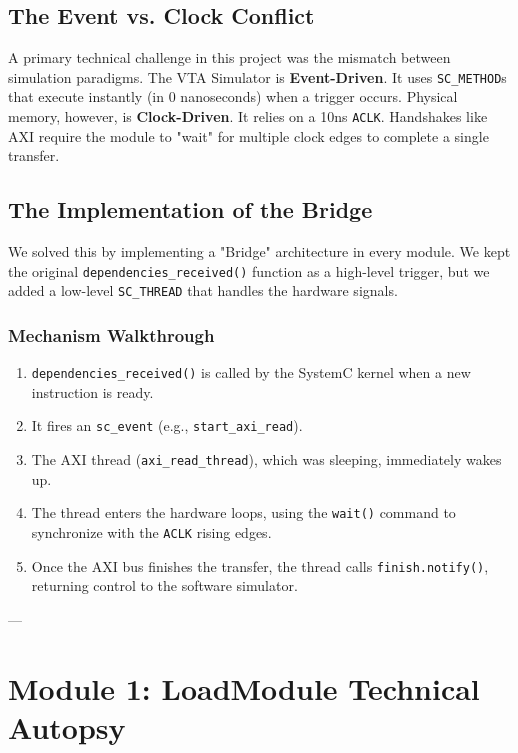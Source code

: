 \documentclass[11pt,a4paper]{report}
\begin{document}
\section{The Event vs. Clock Conflict}
A primary technical challenge in this project was the mismatch between simulation paradigms. 
The VTA Simulator is \textbf{Event-Driven}. It uses \texttt{SC\_METHOD}s that execute instantly (in 0 nanoseconds) when a trigger occurs. 
Physical memory, however, is \textbf{Clock-Driven}. It relies on a 10ns \texttt{ACLK}. Handshakes like AXI require the module to "wait" for multiple clock edges to complete a single transfer.

\section{The Implementation of the Bridge}
We solved this by implementing a "Bridge" architecture in every module. We kept the original \texttt{dependencies\_received()} function as a high-level trigger, but we added a low-level \texttt{SC\_THREAD} that handles the hardware signals.

\subsection{Mechanism Walkthrough}
\begin{enumerate}
    \item \texttt{dependencies\_received()} is called by the SystemC kernel when a new instruction is ready.
    \item It fires an \texttt{sc\_event} (e.g., \texttt{start\_axi\_read}).
    \item The AXI thread (\texttt{axi\_read\_thread}), which was sleeping, immediately wakes up.
    \item The thread enters the hardware loops, using the \texttt{wait()} command to synchronize with the \texttt{ACLK} rising edges.
    \item Once the AXI bus finishes the transfer, the thread calls \texttt{finish.notify()}, returning control to the software simulator.
\end{enumerate}

---

\chapter{Module 1: LoadModule Technical Autopsy}
\end{document}
